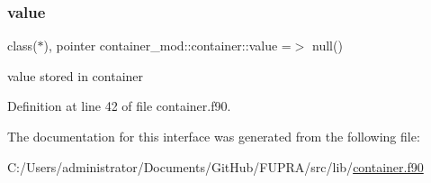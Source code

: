 \subsubsection{\texorpdfstring{value}{value}}
{\footnotesize\ttfamily class($\ast$), pointer container\+\_\+mod\+::container\+::value =$>$ null()\hspace{0.3cm}{\ttfamily [private]}}



value stored in container 



Definition at line 42 of file container.\+f90.



The documentation for this interface was generated from the following file\+:\begin{DoxyCompactItemize}
\item 
C\+:/\+Users/administrator/\+Documents/\+Git\+Hub/\+F\+U\+P\+R\+A/src/lib/\mbox{\hyperlink{container_8f90}{container.\+f90}}\end{DoxyCompactItemize}
